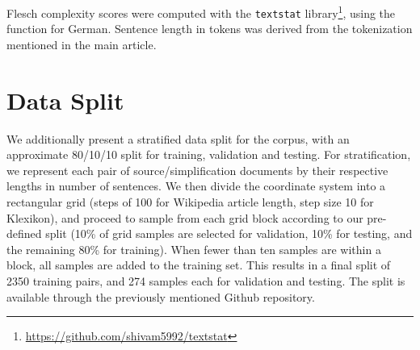 \documentclass[10pt, a4paper]{article}
\begin{document}
Flesch complexity scores were computed with the \texttt{textstat} library\footnote{\url{https://github.com/shivam5992/textstat}}, using the function for German. Sentence length in tokens was derived from the tokenization mentioned in the main article.


\section{Data Split}
We additionally present a stratified data split for the corpus, with an approximate 80/10/10 split for training, validation and testing.
For stratification, we represent each pair of source/simplification documents by their respective lengths in number of sentences.
We then divide the coordinate system into a rectangular grid (steps of 100 for Wikipedia article length, step size 10 for Klexikon), and proceed to sample from each grid block according to our pre-defined split (10\% of grid samples are selected for validation, 10\% for testing, and the remaining 80\% for training). When fewer than ten samples are within a block, all samples are added to the training set. This results in a final split of 2350 training pairs, and 274 samples each for validation and testing. The split is available through the previously mentioned Github repository.
\end{document}
